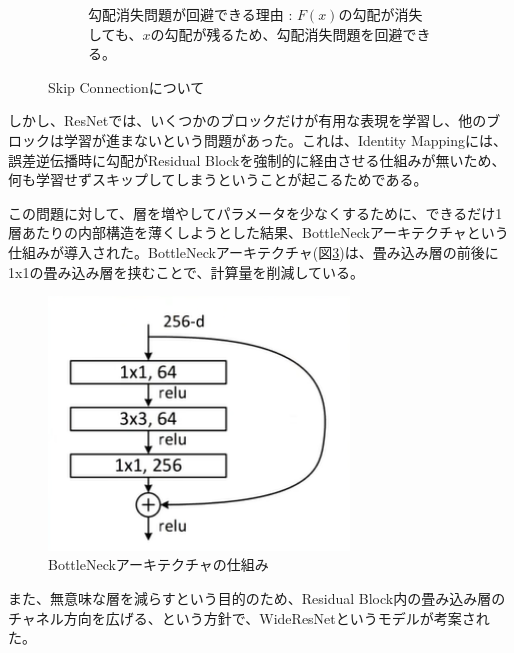 \documentclass{ltjsarticle}
\begin{document}
\begin{figure}[htbp]
\begin{subfigure}[b]{0.45\textwidth}
    \caption{勾配消失問題が回避できる理由 : $F(x)$の勾配が消失しても、$x$の勾配が残るため、勾配消失問題を回避できる。}
    \label{fig:Skip_Connection_BackProp}
  \end{subfigure}
  \caption{Skip Connectionについて}
\end{figure}
\par
しかし、ResNetでは、いくつかのブロックだけが有用な表現を学習し、他のブロックは学習が進まないという問題があった。これは、Identity Mappingには、誤差逆伝播時に勾配がResidual Blockを強制的に経由させる仕組みが無いため、何も学習せずスキップしてしまうということが起こるためである。
\par
この問題に対して、層を増やしてパラメータを少なくするために、できるだけ1層あたりの内部構造を薄くしようとした結果、BottleNeckアーキテクチャという仕組みが導入された。BottleNeckアーキテクチャ(図\ref{fig:BottleNeck})は、畳み込み層の前後に1x1の畳み込み層を挟むことで、計算量を削減している。

\begin{figure}[htbp]
  \centering
  \includegraphics[width=8cm]{./capture/Bottleneck.png}
  \caption{BottleNeckアーキテクチャの仕組み}
  \label{fig:BottleNeck}
\end{figure}
\par
また、無意味な層を減らすという目的のため、Residual Block内の畳み込み層のチャネル方向を広げる、という方針で、WideResNetというモデルが考案された。
\end{document}
